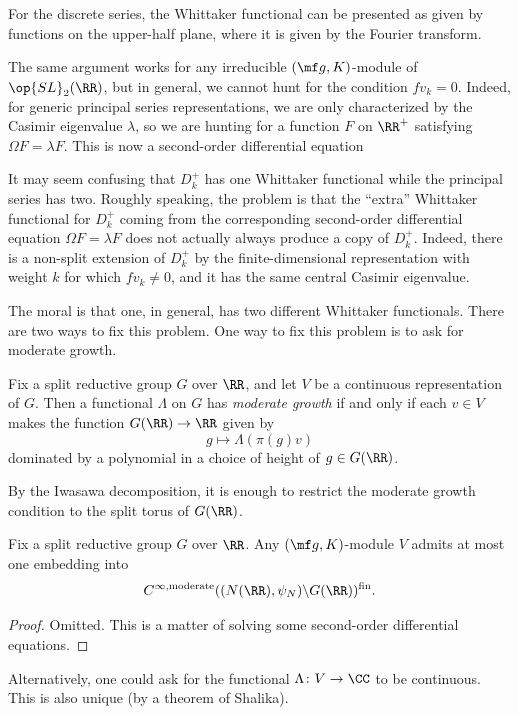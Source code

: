 \documentclass[../notes.tex]{subfiles}
\begin{document}
\begin{remark}
	For the discrete series, the Whittaker functional can be presented as given by functions on the upper-half plane, where it is given by the Fourier transform.
\end{remark}
\begin{remark}
	The same argument works for any irreducible $(\mf g,K)$-module of $\op{SL}_2(\RR)$, but in general, we cannot hunt for the condition $fv_k=0$. Indeed, for generic principal series representations, we are only characterized by the Casimir eigenvalue $\lambda$, so we are hunting for a function $F$ on $\RR^+$ satisfying $\Omega F=\lambda F$. This is now a second-order differential equation
\end{remark}
\begin{remark}
	It may seem confusing that $D_k^+$ has one Whittaker functional while the principal series has two. Roughly speaking, the problem is that the ``extra'' Whittaker functional for $D_k^+$ coming from the corresponding second-order differential equation $\Omega F=\lambda F$ does not actually always produce a copy of $D_k^+$. Indeed, there is a non-split extension of $D_k^+$ by the finite-dimensional representation with weight $k$ for which $fv_k\ne0$, and it has the same central Casimir eigenvalue.
\end{remark}
The moral is that one, in general, has two different Whittaker functionals. There are two ways to fix this problem. One way to fix this problem is to ask for moderate growth.
\begin{definition} \label{def:mod-growth}
	Fix a split reductive group $G$ over $\RR$, and let $V$ be a continuous representation of $G$. Then a functional $\Lambda$ on $G$ has \textit{moderate growth} if and only if each $v\in V$ makes the function $G(\RR)\to\RR$ given by
	\[g\mapsto\Lambda(\pi(g)v)\]
	dominated by a polynomial in a choice of height of $g\in G(\RR)$.
\end{definition}
\begin{remark}
	By the Iwasawa decomposition, it is enough to restrict the moderate growth condition to the split torus of $G(\RR)$.
\end{remark}
\begin{proposition}
	Fix a split reductive group $G$ over $\RR$. Any $(\mf g,K)$-module $V$ admits at most one embedding into
	\[C^{\infty,\mathrm{moderate}}((N(\RR),\psi_N)\backslash G(\RR))^{\mathrm{fin}}.\]
\end{proposition}
\begin{proof}
	Omitted. This is a matter of solving some second-order differential equations.
\end{proof}
\begin{remark}
	Alternatively, one could ask for the functional $\Lambda\colon V\to\CC$ to be continuous. This is also unique (by a theorem of Shalika).
\end{remark}
\end{document}
